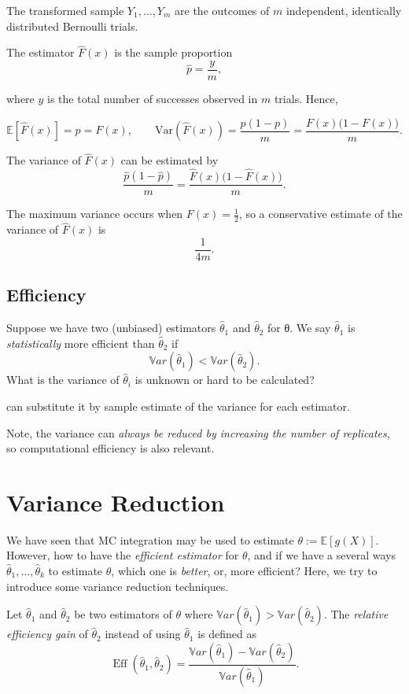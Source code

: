 \documentclass[
  letterpaper,
  DIV=11,
  numbers=noendperiod]{scrreprt}
\begin{document}
The transformed sample \(Y_1, \ldots, Y_m\) are the outcomes of \(m\)
independent, identically distributed Bernoulli trials.

The estimator \(\hat{F}(x)\) is the sample proportion \[
\hat{p} = \frac{y}{m},
\]

where \(y\) is the total number of successes observed in \(m\) trials.
Hence,

\[
\mathbb{E}[\hat{F}(x)] = p = F(x), \qquad 
\mathrm{Var}(\hat{F}(x)) = \frac{p(1-p)}{m} = \frac{F(x)\big(1-F(x)\big)}{m}.
\]

The variance of \(\hat{F}(x)\) can be estimated by \[
\frac{\hat{p}(1-\hat{p})}{m} = \frac{\hat{F}(x)\big(1-\hat{F}(x)\big)}{m}.
\]

The maximum variance occurs when \(F(x) = \tfrac{1}{2}\), so a
conservative estimate of the variance of \(\hat{F}(x)\) is \[
\frac{1}{4m}.
\]

\subsection{Efficiency}\label{efficiency}

Suppose we have two (unbiased) estimators \(\hat{\theta}_1\) and
\(\hat{\theta}_2\) for θ. We say \(\hat{\theta}_1\) is
\emph{statistically} more efficient than \(\hat{\theta}_2\) if
\[\mathbb{V}ar(\hat{\theta}_1) < \mathbb{V}ar(\hat{\theta}_2).\] What is
the variance of \(\hat{\theta}_i\) is unknown or hard to be calculated?

can substitute it by sample estimate of the variance for each estimator.

Note, the variance can \emph{always be reduced by increasing the number
of replicates}, so computational efficiency is also relevant.

\section{Variance Reduction}\label{variance-reduction}

We have seen that MC integration may be used to estimate
\(\theta:=\mathbb{E}[g(X)]\). However, how to have the \emph{efficient
estimator} for \(\theta\), and if we have a several ways
\(\hat{\theta}_1,\dots,\hat{\theta}_k\) to estimate \(\theta\), which
one is \emph{better}, or, more efficient? Here, we try to introduce some
variance reduction techniques.

Let \(\hat{\theta}_1\) and \(\hat{\theta}_2\) be two estimators of
\(\theta\) where
\(\mathbb{V}ar(\hat{\theta}_1) > \mathbb{V}ar(\hat{\theta}_2)\). The
\emph{relative efficiency gain} of \(\hat{\theta}_2\) instead of using
\(\hat{\theta}_1\) is defined as \[
\operatorname{Eff}(\hat{\theta}_1, \hat{\theta}_2) = \frac{\mathbb{V}ar(\hat{\theta}_1)- \mathbb{V}ar(\hat{\theta}_2)}{\mathbb{V}ar(\hat{\theta}_1)}.
\]
\end{document}

